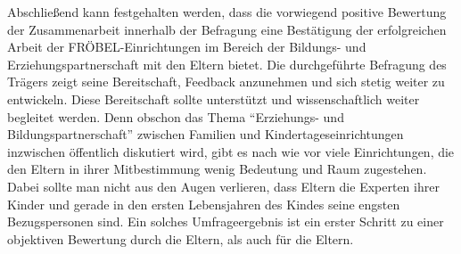 \documentclass[12pt,a4paper]{article}
\begin{document}
	Abschließend kann festgehalten werden, dass die vorwiegend positive Bewertung der Zusammenarbeit innerhalb der Befragung eine Bestätigung der erfolgreichen Arbeit der FRÖBEL-Einrichtungen im Bereich der Bildungs- und Erziehungspartnerschaft mit den Eltern bietet. Die durchgeführte Befragung des Trägers zeigt seine Bereitschaft, Feedback anzunehmen und sich stetig weiter zu entwickeln. Diese Bereitschaft sollte unterstützt und wissenschaftlich weiter begleitet werden. Denn obschon das Thema "`Erziehungs- und Bildungspartnerschaft"' zwischen Familien und Kindertageseinrichtungen inzwischen öffentlich diskutiert wird, gibt es nach wie vor viele Einrichtungen, die den Eltern in ihrer Mitbestimmung wenig Bedeutung und Raum zugestehen. Dabei sollte man nicht aus den Augen verlieren, dass Eltern die Experten ihrer Kinder und gerade in den ersten Lebensjahren des Kindes seine engsten Bezugspersonen sind. Ein solches Umfrageergebnis ist ein erster Schritt zu einer objektiven Bewertung durch die Eltern, als auch für die Eltern.
	

\pagebreak	 


\printbibliography


%
%

%



\pagebreak
\end{document}
